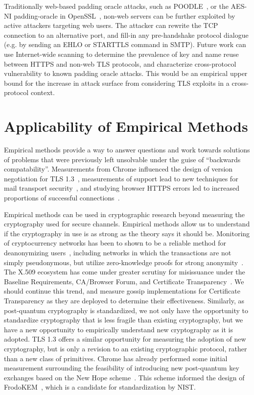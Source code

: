Traditionally web-based padding oracle attacks, such as
POODLE~\cite{poodle-2014}, or the AES-NI padding-oracle in
OpenSSL~\cite{cve-2016-2107}, non-web servers can be further exploited by
active attackers targeting web users. The attacker can rewrite the TCP
connection to an alternative port, and fill-in any pre-handshake protocol
dialogue (e.g. by sending an EHLO or STARTTLS command in SMTP). Future work
can use Internet-wide scanning to determine the prevalence of key and name
reuse between HTTPS and non-web TLS protocols, and characterize
cross-protocol vulnerability to known padding oracle attacks. This would be
an empirical upper bound for the increase in attack surface from considering
TLS exploits in a cross-protocol context.

\section{Applicability of Empirical Methods}

Empirical methods provide a way to answer questions and work towards
solutions of problems that were previously left unsolvable under the guise of
``backwards compatability''. Measurements from Chrome influenced the design
of version negotiation for TLS 1.3~\cite{why-tls-13-browsers-cloudflare},
measurements of \starttls support lead to new techniques for mail transport
security~\cite{google-email-transparency-report,mail-2015,rfc8461}, and
studying browser HTTPS errors led to increased proportions of successful
connections~\cite{wild-warnings-2017}.

Empirical methods can be used in cryptographic research beyond measuring the
cryptography used for secure channels. Empirical methods allow us to
understand if the cryptography in use is as strong as the theory says it
should be. Monitoring of cryptocurrency networks has been to shown to be a
reliable method for deanonymizing
users~\cite{bitcoin-deanon-2014-koshy,bitcoin-deanon-2014-biryukov},
including networks in which the transactions are not simply pseudonymous, but
utilize zero-knowledge proofs for strong
anonymity~\cite{zcash-2014,zcash-deanon-2018}. The X.509 ecosystem has come
under greater scrutiny for misissuance under the Baseline Requirements,
CA/Browser Forum, and Certificate Transparency~\cite{zlint-2018}. We should
continue this trend, and measure gossip implementations for Certificate
Transparency as they are deployed to determine their effectiveness.
Similarly, as post-quantum cryptography is standardized, we not only have the
opportunity to standardize cryptography that is less fragile than existing
cryptography, but we have a new opportunity to empirically understand new
cryptography as it is adopted. TLS 1.3 offers a similar opportunity for
measuring the adoption of new cryptography, but is only a revision to an
existing cryptographic protocol, rather than a new class of primitives.
Chrome has already performed some initial measurement surrounding the
feasibility of introducing new post-quantum key exchanges based on the New
Hope scheme~\cite{new-hope-2016,chrome-pqc-2016}. This scheme informed the
design of FrodoKEM~\cite{frodo-kem-2017}, which is a candidate for
standardization by NIST.

